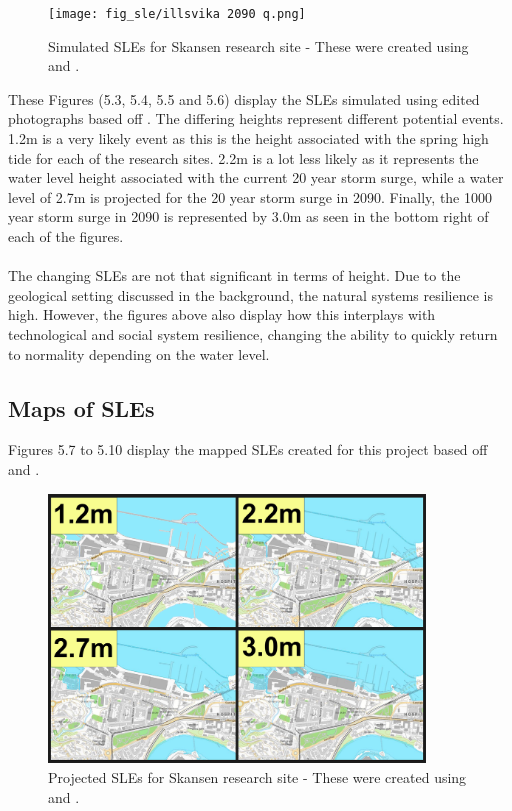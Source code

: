 \begin{figure}[H]
    \centering
    \texttt{[image: fig\_sle/illsvika 2090 q.png]}
    \caption{Simulated SLEs for Skansen research site - These were created using \cite{kartverket_se_2021} and \cite{stormflo_database_stormflo_2021}. }
    \label{fig:sle-skansen}
\end{figure}


These Figures (5.3, 5.4, 5.5 and 5.6) display the SLEs simulated using edited photographs based off \cite{kartverket_se_2020}. The differing heights represent different potential events. 1.2m is a very likely event as this is the height associated with the spring high tide for each of the research sites. 2.2m is a lot less likely as it represents the water level height associated with the current 20 year storm surge, while a water level of 2.7m is projected for the 20 year storm surge in 2090. Finally, the 1000 year storm surge in 2090 is represented by 3.0m as seen in the bottom right of each of the figures.
\paragraph{}
The changing SLEs are not that significant in terms of height. Due to the geological setting discussed in the background, the natural systems resilience is high. However, the figures above also display how this interplays with technological and social system resilience, changing the ability to quickly return to normality depending on the water level. 


\subsection{Maps of SLEs}
Figures 5.7 to 5.10 display the mapped SLEs created for this project based off \cite{kartverket_se_2020} and \cite{stormflo_database_stormflo_2021}.

\begin{figure}[H]
    \centering
    \includegraphics[width=10cm]{fig_sle/skansen-sle-num.png}
    \caption{Projected SLEs for Skansen research site - These were created using \cite{kartverket_se_2021} and \cite{stormflo_database_stormflo_2021}. }
    \label{fig:sle-skansen-num}
\end{figure}

